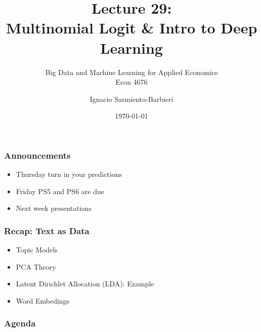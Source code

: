 \documentclass[
  shownotes,
  xcolor={svgnames},
  hyperref={colorlinks,citecolor=DarkBlue,linkcolor=DarkRed,urlcolor=DarkBlue}
  , aspectratio=169]{beamer}
\begin{document}
\title[Lecture 29]{Lecture 29: \\ Multinomial Logit \& Intro to Deep Learning }
\subtitle{Big Data and Machine Learning for Applied Economics \\ Econ 4676}
\date{\today}

\author[Sarmiento-Barbieri]{Ignacio Sarmiento-Barbieri}


\begin{frame}[noframenumbering]
\maketitle
\end{frame}





\begin{frame}
\frametitle{Announcements }


\begin{itemize} 
    \item  Thursday turn in your predictions
    \bigskip
    \item  Friday PS5 and PS6 are due
    \bigskip
    \item  Next week presentations
    \bigskip
    
    
\end{itemize}
\end{frame}

\begin{frame}
\frametitle{Recap: Text as Data}

\begin{itemize} 
  
\item Topic Models
\bigskip
\item PCA Theory
\bigskip
\item Latent Dirichlet Allocation (LDA): Example
\bigskip
\item  Word Embedings
\end{itemize}
  
\end{frame}


\begin{frame}
\frametitle{Agenda}

\tableofcontents

\end{frame}
\end{document}
